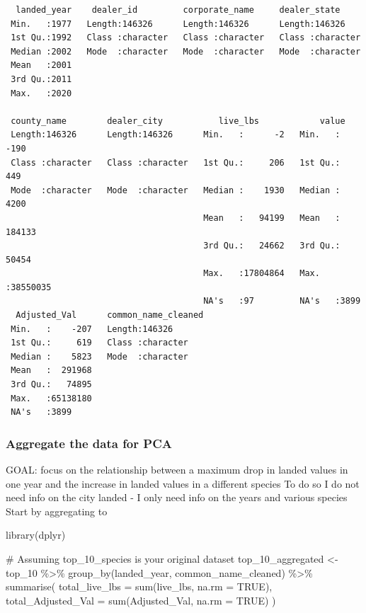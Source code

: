 \documentclass[
  letterpaper,
  DIV=11,
  numbers=noendperiod]{scrartcl}
\newenvironment{Shaded}{\begin{snugshade}}{\end{snugshade}}
\newcommand{\AttributeTok}[1]{\textcolor[rgb]{0.40,0.45,0.13}{#1}}
\newcommand{\CommentTok}[1]{\textcolor[rgb]{0.37,0.37,0.37}{#1}}
\newcommand{\ConstantTok}[1]{\textcolor[rgb]{0.56,0.35,0.01}{#1}}
\newcommand{\FunctionTok}[1]{\textcolor[rgb]{0.28,0.35,0.67}{#1}}
\newcommand{\NormalTok}[1]{\textcolor[rgb]{0.00,0.23,0.31}{#1}}
\newcommand{\OtherTok}[1]{\textcolor[rgb]{0.00,0.23,0.31}{#1}}
\newcommand{\SpecialCharTok}[1]{\textcolor[rgb]{0.37,0.37,0.37}{#1}}
\begin{document}
\begin{verbatim}
  landed_year    dealer_id         corporate_name     dealer_state      
 Min.   :1977   Length:146326      Length:146326      Length:146326     
 1st Qu.:1992   Class :character   Class :character   Class :character  
 Median :2002   Mode  :character   Mode  :character   Mode  :character  
 Mean   :2001                                                           
 3rd Qu.:2011                                                           
 Max.   :2020                                                           
                                                                        
 county_name        dealer_city           live_lbs            value         
 Length:146326      Length:146326      Min.   :      -2   Min.   :    -190  
 Class :character   Class :character   1st Qu.:     206   1st Qu.:     449  
 Mode  :character   Mode  :character   Median :    1930   Median :    4200  
                                       Mean   :   94199   Mean   :  184133  
                                       3rd Qu.:   24662   3rd Qu.:   50454  
                                       Max.   :17804864   Max.   :38550035  
                                       NA's   :97         NA's   :3899      
  Adjusted_Val      common_name_cleaned
 Min.   :    -207   Length:146326      
 1st Qu.:     619   Class :character   
 Median :    5823   Mode  :character   
 Mean   :  291968                      
 3rd Qu.:   74895                      
 Max.   :65138180                      
 NA's   :3899                          
\end{verbatim}

\hypertarget{aggregate-the-data-for-pca}{%
\subsubsection{Aggregate the data for
PCA}\label{aggregate-the-data-for-pca}}

GOAL: focus on the relationship between a maximum drop in landed values
in one year and the increase in landed values in a different species To
do so I do not need info on the city landed - I only need info on the
years and various species Start by aggregating to

\begin{Shaded}
\begin{Highlighting}[]
\FunctionTok{library}\NormalTok{(dplyr)}

\CommentTok{\# Assuming top\_10\_species is your original dataset}
\NormalTok{top\_10\_aggregated }\OtherTok{\textless{}{-}}\NormalTok{ top\_10 }\SpecialCharTok{\%\textgreater{}\%}
  \FunctionTok{group\_by}\NormalTok{(landed\_year, common\_name\_cleaned) }\SpecialCharTok{\%\textgreater{}\%}
  \FunctionTok{summarise}\NormalTok{(}
    \AttributeTok{total\_live\_lbs =} \FunctionTok{sum}\NormalTok{(live\_lbs, }\AttributeTok{na.rm =} \ConstantTok{TRUE}\NormalTok{),}
    \AttributeTok{total\_Adjusted\_Val =} \FunctionTok{sum}\NormalTok{(Adjusted\_Val, }\AttributeTok{na.rm =} \ConstantTok{TRUE}\NormalTok{)}
\NormalTok{ )}
\end{Highlighting}
\end{Shaded}
\end{document}
